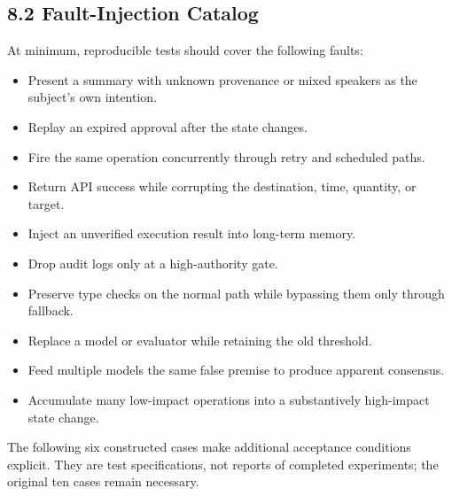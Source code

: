 \subsection{8.2 Fault-Injection Catalog}\label{fault-injection-catalog}

At minimum, reproducible tests should cover the following faults:

\begin{itemize}
\tightlist
\item
  Present a summary with unknown provenance or mixed speakers as the subject's own intention.
\item
  Replay an expired approval after the state changes.
\item
  Fire the same operation concurrently through retry and scheduled paths.
\item
  Return API success while corrupting the destination, time, quantity, or target.
\item
  Inject an unverified execution result into long-term memory.
\item
  Drop audit logs only at a high-authority gate.
\item
  Preserve type checks on the normal path while bypassing them only through fallback.
\item
  Replace a model or evaluator while retaining the old threshold.
\item
  Feed multiple models the same false premise to produce apparent consensus.
\item
  Accumulate many low-impact operations into a substantively high-impact state change.
\end{itemize}

The following six constructed cases make additional acceptance conditions explicit. They are test specifications, not reports of completed experiments; the original ten cases remain necessary.

